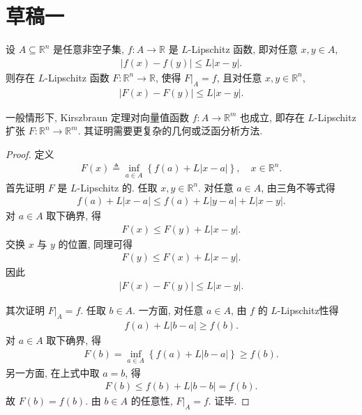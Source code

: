 \documentclass[../../main.tex]{subfiles}%
\begin{document}
\section{草稿一}

\begin{theorem}\label{theorem:实值-Kirszbraun扩张定理}
设 $A\subseteq\mathbb{R}^n$ 是任意非空子集, $f:A\to\mathbb{R}$ 是 $L$-Lipschitz 函数, 即对任意 $x,y\in A$,
\begin{align*}
|f(x)-f(y)|\leqslant L|x-y|.
\end{align*}
则存在 $L$-Lipschitz 函数 $F:\mathbb{R}^n\to\mathbb{R}$, 使得 $F|_A=f$, 且对任意 $x,y\in\mathbb{R}^n$,
\begin{align*}
|F(x)-F(y)|\leqslant L|x-y|.
\end{align*}
\end{theorem}
\begin{remark}
一般情形下, Kirszbraun 定理对向量值函数 $f:A\to\mathbb{R}^m$ 也成立, 即存在 $L$-Lipschitz 扩张 $F:\mathbb{R}^n\to\mathbb{R}^m$. 其证明需要更复杂的几何或泛函分析方法.
\end{remark}
\begin{proof}

定义
\begin{align*}
F(x)\triangleq\inf\limits_{a\in A}\left\{f(a)+L|x-a|\right\},\quad x\in\mathbb{R}^n.
\end{align*}
首先证明 $F$ 是 $L$-Lipschitz 的. 任取 $x,y\in\mathbb{R}^n$. 对任意 $a\in A$, 由三角不等式得
\begin{align*}
f(a)+L|x-a|\leqslant f(a)+L|y-a|+L|x-y|.
\end{align*}
对 $a\in A$ 取下确界, 得
\begin{align*}
F(x)\leqslant F(y)+L|x-y|.
\end{align*}
交换 $x$ 与 $y$ 的位置, 同理可得
\begin{align*}
F(y)\leqslant F(x)+L|x-y|.
\end{align*}
因此
\begin{align*}
|F(x)-F(y)|\leqslant L|x-y|.
\end{align*}

其次证明 $F|_A=f$. 任取 $b\in A$. 一方面, 对任意 $a\in A$, 由 $f$ 的 $L$-Lipschitz性得
\begin{align*}
f(a)+L|b-a|\geqslant f(b).
\end{align*}
对 $a\in A$ 取下确界, 得
\begin{align*}
F(b)=\inf\limits_{a\in A}\left\{f(a)+L|b-a|\right\}\geqslant f(b).
\end{align*}
另一方面, 在上式中取 $a=b$, 得
\begin{align*}
F(b)\leqslant f(b)+L|b-b|=f(b).
\end{align*}
故 $F(b)=f(b)$. 由 $b\in A$ 的任意性, $F|_A=f$. 证毕.
\end{proof}
\end{document}
